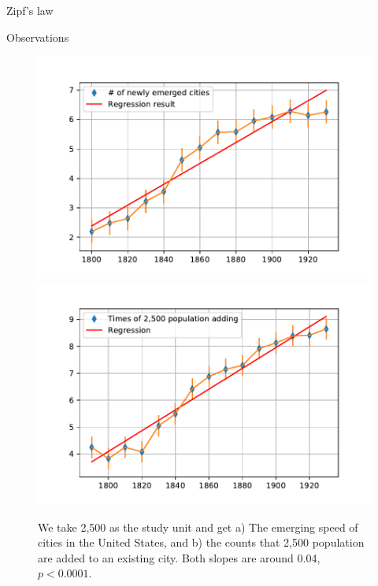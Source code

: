 \documentclass{beamer}
\begin{document}
\begin{frame}{Zipf's law}
\begin{frame}{Observations}
  \begin{figure}
    \includegraphics[width=0.48\linewidth]{pics/city_emerge.pdf}
    \includegraphics[width=0.48\linewidth]{pics/metapop_adding.pdf}
    \caption{We take 2,500 as the study unit and get a) The emerging speed of cities in the United States, and b) the counts that 2,500 population are added to an existing city. Both slopes are around 0.04, $p<0.0001$.}
  \end{figure}
\end{frame}


\end{frame}
\end{document}
